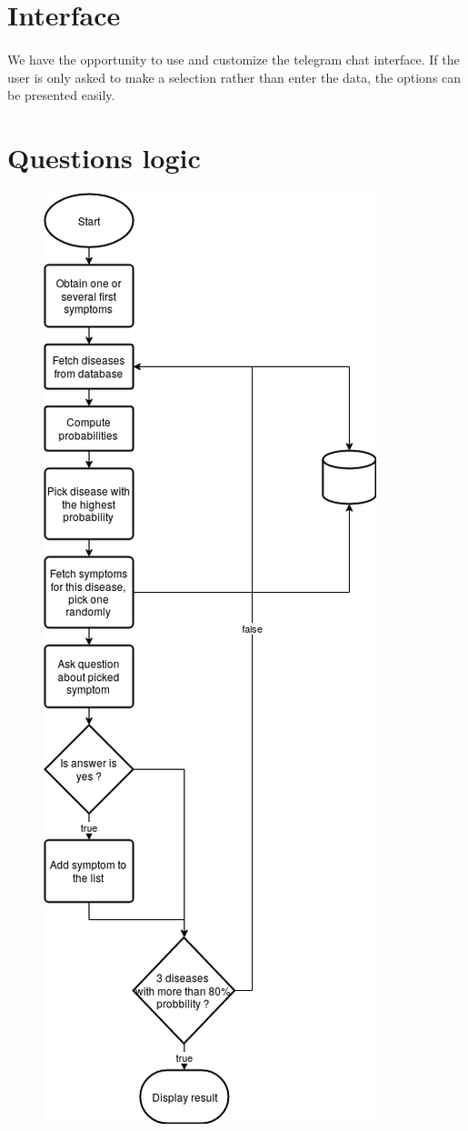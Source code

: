 \section{Interface}

\paragraph{}
We	have	the	opportunity	to	use	and	customize	the	telegram	chat	interface.	If	the	user	is	only	asked	to	make	a	selection	rather	than	enter	the	data,	the	options	can	be	presented	easily.	

\section{Questions logic}

\begin{figure}[H]
	\centering
	\includegraphics[height=0.9\textheight]{flow_chart_questions}

\end{figure}
